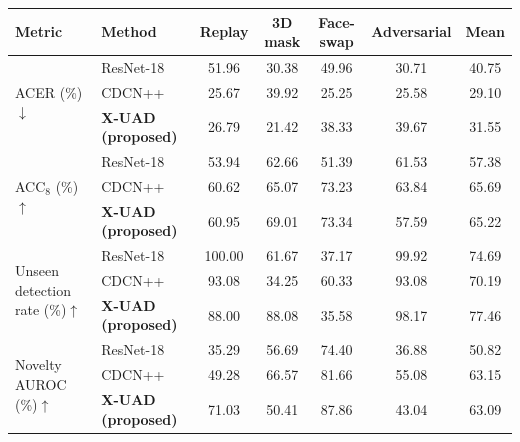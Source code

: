 \begin{tabular}{llccccc}
\toprule
Metric & Method & Replay & 3D mask & Face-swap & Adversarial & Mean \\
\midrule
\multirow{3}{*}{ACER (\%)$\downarrow$} & ResNet-18~\cite{he2016resnet} & 51.96 & 30.38 & 49.96 & 30.71 & 40.75 \\
 & CDCN++~\cite{yu2020cdcn} & 25.67 & 39.92 & 25.25 & 25.58 & 29.10 \\
 & \textbf{X-UAD (proposed)} & 26.79 & 21.42 & 38.33 & 39.67 & 31.55 \\
\midrule
\multirow{3}{*}{ACC$_8$ (\%)$\uparrow$} & ResNet-18~\cite{he2016resnet} & 53.94 & 62.66 & 51.39 & 61.53 & 57.38 \\
 & CDCN++~\cite{yu2020cdcn} & 60.62 & 65.07 & 73.23 & 63.84 & 65.69 \\
 & \textbf{X-UAD (proposed)} & 60.95 & 69.01 & 73.34 & 57.59 & 65.22 \\
\midrule
\multirow{3}{*}{Unseen detection rate (\%)$\uparrow$} & ResNet-18~\cite{he2016resnet} & 100.00 & 61.67 & 37.17 & 99.92 & 74.69 \\
 & CDCN++~\cite{yu2020cdcn} & 93.08 & 34.25 & 60.33 & 93.08 & 70.19 \\
 & \textbf{X-UAD (proposed)} & 88.00 & 88.08 & 35.58 & 98.17 & 77.46 \\
\midrule
\multirow{3}{*}{Novelty AUROC (\%)$\uparrow$} & ResNet-18~\cite{he2016resnet} & 35.29 & 56.69 & 74.40 & 36.88 & 50.82 \\
 & CDCN++~\cite{yu2020cdcn} & 49.28 & 66.57 & 81.66 & 55.08 & 63.15 \\
 & \textbf{X-UAD (proposed)} & 71.03 & 50.41 & 87.86 & 43.04 & 63.09 \\
\bottomrule
\end{tabular}